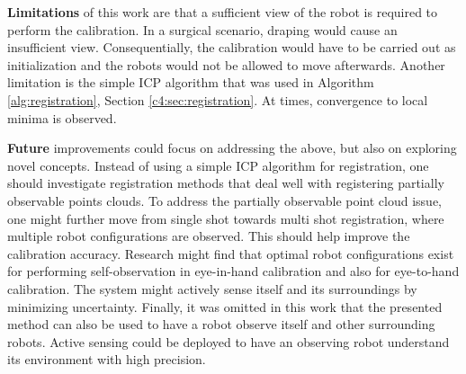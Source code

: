 \textbf{Limitations} of this work are that a sufficient view of the robot is required to perform the calibration. In a surgical scenario, draping would cause an insufficient view. Consequentially, the calibration would have to be carried out as initialization and the robots would not be allowed to move afterwards. Another limitation is the simple ICP algorithm that was used in Algorithm \ref{alg:registration}, Section \ref{c4:sec:registration}. At times, convergence to local minima is observed.

\textbf{Future} improvements could focus on addressing the above, but also on exploring novel concepts. Instead of using a simple ICP algorithm for registration, one should investigate registration methods that deal well with registering partially observable points clouds. To address the partially observable point cloud issue, one might further move from single shot towards multi shot registration, where multiple robot configurations are observed. This should help improve the calibration accuracy. Research might find that optimal robot configurations exist for performing self-observation in eye-in-hand calibration and also for eye-to-hand calibration. The system might actively sense itself and its surroundings by minimizing uncertainty. Finally, it was omitted in this work that the presented method can also be used to have a robot observe itself and other surrounding robots. Active sensing could be deployed to have an observing robot understand its environment with high precision.
